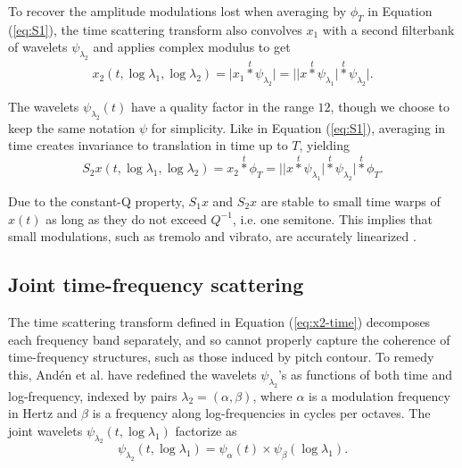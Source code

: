 \documentclass[twoside,a4paper]{article}
\begin{document}
To recover the amplitude modulations lost when averaging by $\phi_T$ in
Equation (\ref{eq:S1}), the time scattering transform also convolves $x_1$ with a second filterbank of wavelets $\psi_{\lambda_2}$ and applies complex modulus to get
\begin{equation}
x_2 (t, \log \lambda_1, \log \lambda_2) =
\vert x_1 \overset{t}{\ast} \psi_{\lambda_2} \vert =
\vert \vert x \overset{t}{\ast} \psi_{\lambda_{1}} \vert
\overset{t}{\ast} \psi_{\lambda_{2}} \vert.
\label{eq:x2-time}
\end{equation}

The wavelets $\psi_{\lambda_2}(t)$ have a quality factor in the range $1$\textendash$2$, though we choose to keep the same notation $\psi$ for simplicity. Like in Equation (\ref{eq:S1}), averaging in time creates invariance to translation in time up to $T$, yielding
\begin{equation}
S_2 x (t, \log \lambda_1, \log \lambda_2) =
x_2 \overset{t}{\ast} \phi_T =
\vert \vert x \overset{t}{\ast} \psi_{\lambda_{1}} \vert
\overset{t}{\ast} \psi_{\lambda_{2}} \vert
\overset{t}{\ast} \phi_T.
\label{eq:S2-time}
\end{equation}

Due to the constant-Q property, $S_1 x$ and $S_2 x$ are stable to small time warps of $x(t)$ as long as they do not exceed $Q^{-1}$, i.e. one semitone. This implies that small modulations, such as tremolo and vibrato, are accurately linearized \cite{Anden2012}.



\subsection{Joint time-frequency scattering}

The time scattering transform defined in Equation (\ref{eq:x2-time}) decomposes each frequency band separately, and so cannot properly capture the coherence of time-frequency structures, such as those induced by pitch contour. To remedy this, And\'{e}n et al. \cite{Anden2015} have redefined the wavelets $\psi_{\lambda_2}$'s as functions of both time and log-frequency, indexed by pairs $\lambda_2 = (\alpha,\beta)$, where $\alpha$ is a modulation frequency in Hertz and $\beta$ is a frequency along log-frequencies in cycles per octaves. The joint wavelets $\psi_{\lambda_2}(t,\log \lambda_1)$ factorize as
\begin{equation}
\psi_{\lambda_2}(t,\log \lambda_1) = \psi_\alpha (t) \times \psi_\beta (\log \lambda_1).
\label{eq:wavelet-joint}
\end{equation}
\end{document}
